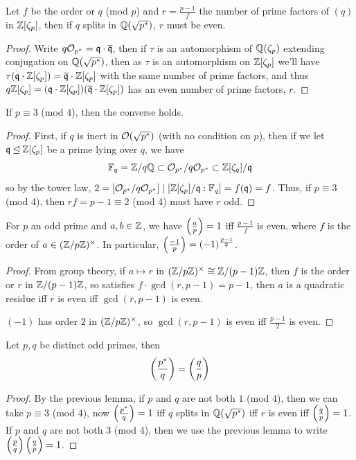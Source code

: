 \documentclass{article}
\begin{document}
\begin{lemma}
    Let $f$ be the order or $q$ (mod $p$) and $r=\frac{p-1}{f}$ the number of prime factors of $(q)$ in $\mathbb{Z}[\zeta_p]$, then if $q$ splits in $\mathbb{Q}(\sqrt{p^*})$, $r$ must be even.\begin{proof}
        Write $q\mathcal{O}_{p^*}=\mathfrak{q}\cdot\overline{\mathfrak{q}}$, then if $\tau$ is an automorphism of $\mathbb{Q}(\zeta_p)$ extending conjugation on $\mathbb{Q}(\sqrt{p^*})$, then as $\tau$ is an automorphism on $\mathbb{Z}[\zeta_p]$ we'll have $\tau(\mathfrak{q}\cdot\mathbb{Z}[\zeta_p]) = \overline{\mathfrak{q}}\cdot\mathbb{Z}[\zeta_p]$ with the same number of prime factors, and thus $q\mathbb{Z}[\zeta_p] = (\mathfrak{q}\cdot\mathbb{Z}[\zeta_p])(\overline{\mathfrak{q}}\cdot\mathbb{Z}[\zeta_p])$ has an even number of prime factors, $r$.
    \end{proof}
\end{lemma}

\begin{lemma}
    If $p\equiv 3$ (mod $4$), then the converse holds.
    \begin{proof}
        First, if $q$ is inert in $\mathcal{O}(\sqrt{p^*})$ (with no condition on $p$), then if we let $\mathfrak{q}\unlhd \mathbb{Z}[\zeta_p]$ be a prime lying over $q$, we have \[
        \mathbb{F}_q = \mathbb{Z}/q\mathbb{Q} \subset \mathcal{O}_{p^*}/q\mathcal{O}_{p^*} \subset \mathbb{Z}[\zeta_q]/\mathfrak{q}
        \] so by the tower law, $2=[\mathcal{O}_{p^*}/q\mathcal{O}_{p^*}] \mid [\mathbb{Z}[\zeta_p]/\mathfrak{q}:\mathbb{F}_q] = f(\mathfrak{q}) = f$. Thus, if $p\equiv 3$ (mod 4), then $rf = p-1\equiv 2$ (mod 4) must have $r$ odd.
    \end{proof}
\end{lemma}

\begin{lemma}
    For $p$ an odd prime and $a,b\in \mathbb{Z}$, we have $\left( \frac{a}{p} \right)=1$ iff $\frac{p-1}{f}$ is even, where $f$ is the order of $a\in(\mathbb{Z}/p\mathbb{Z})^\times$. In particular, $\left( \frac{-1}{p} \right)=(-1)^{\frac{p-1}{2}}$.
    \begin{proof}
        From group theory, if $a\mapsto r$ in $(\mathbb{Z}/p\mathbb{Z})^\times \cong \mathbb{Z}/(p-1)\mathbb{Z}$, then $f$ is the order or $r$ in $\mathbb{Z}/(p-1)\mathbb{Z}$, so satisfies $f\cdot\gcd(r,p-1)=p-1$, then $a$ is a quadratic residue iff $r$ is even iff $\gcd(r,p-1)$ is even.

        $(-1)$ has order $2$ in $(\mathbb{Z}/p\mathbb{Z})^\times$, so $\gcd(r,p-1)$ is even iff $\frac{p-1}{2}$ is even.
    \end{proof}
\end{lemma}

\begin{theorem}
    Let $p,q$ be distinct odd primes, then \[
    \left( \frac{p^*}{q} \right) = \left( \frac{q}{p} \right)
    \]\begin{proof}
        By the previous lemma, if $p$ and $q$ are not both $1$ (mod 4), then we can take $p\equiv 3$ (mod 4), now $\left( \frac{p^*}{q} \right)=1$ iff $q$ splits in $\mathbb{Q}(\sqrt{p^*})$ iff $r$ is even iff $\left( \frac{q}{p} \right)=1$. If $p$ and $q$ are not both $3$ (mod 4), then we use the previous lemma to write $\left( \frac{p}{q} \right)\left( \frac{q}{p} \right) = 1$.
    \end{proof}
\end{theorem}
\end{document}
